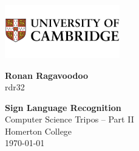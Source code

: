 \documentclass[final,rdr32.tex]{subfiles}
\begin{document}
\pagestyle{empty}

\begin{minipage}{0.4\textwidth}
    \includegraphics[width=50mm]{images/CUni.png}
\end{minipage}
\begin{minipage}{0.5\textwidth}
    \begin{flushright}
        \large \textbf{Ronan Ragavoodoo}\\
        rdr32
    \end{flushright}
\end{minipage}


\vspace*{60mm}
\begin{center}
    \Huge
    \textbf{Sign Language Recognition} \\[5mm]
    Computer Science Tripos -- Part II \\[5mm]
    Homerton College \\[5mm]
    \today  %
\end{center}
\end{document}

